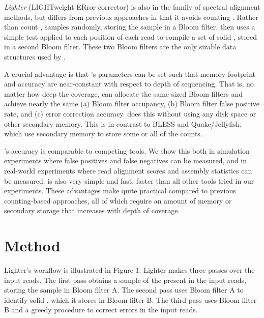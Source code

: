 \documentclass{bmcart}
\begin{document}
\emph{Lighter} (LIGHTweight ERror corrector) is also in the family of spectral alignment methods, but differs from previous approaches in that it avoids counting \kmers.
Rather than count \kmers, \tool samples \kmers randomly, storing the sample in a Bloom filter.
\tool then uses a simple test applied to each position of each read to compile a set of solid \kmers, stored in a second Bloom filter.
These two Bloom filters are the only sizable data structures used by \tool.

A crucial advantage is that \tool's parameters can be set such that memory footprint and accuracy are near-constant with respect to depth of sequencing.
That is, no matter how deep the coverage, \tool can allocate the same sized Bloom filters and achieve nearly the same (a) Bloom filter occupancy, (b) Bloom filter false positive rate, and (c) error correction accuracy.
\tool does this without using any disk space or other secondary memory.
This is in contrast to BLESS and Quake/Jellyfish, which use secondary memory to store some or all of the \kmer counts.

\tool's accuracy is comparable to competing tools.  We show this both in simulation experiments where false positives and false negatives can be measured, and in real-world experiments where read alignment scores and assembly statistics can be measured.  
\tool is also very simple and fast, faster than all other tools tried in our experiments.
These advantages make \tool quite practical compared to previous counting-based approaches, all of which require an amount of memory or secondary storage that increases with depth of coverage.

\section*{Method}
Lighter's workflow is illustrated in Figure 1. Lighter makes three passes over the input reads.  The first pass obtains a sample of the \kmers present in the input reads, storing the sample in Bloom filter A.  The second pass uses Bloom filter A to identify solid \kmers, which it stores in Bloom filter B.  The third pass uses Bloom filter B and a greedy procedure to correct errors in the input reads.
\end{document}
